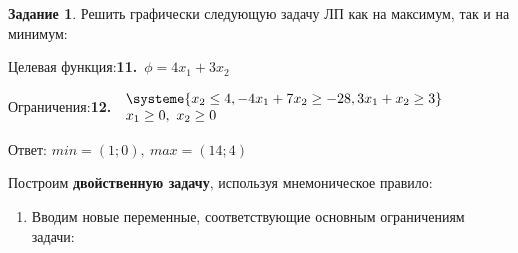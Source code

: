 \documentclass[11pt]{article}
\begin{document}
\textbf{Задание 1}. Решить графически следующую задачу ЛП как на максимум, так и на минимум:

Целевая функция:\quad  \textbf{11.}\  $\phi = 4x_1 + 3x_2$

Ограничения:\quad \textbf{12.}\  $
\begin{array}{l}
\systeme{  x_2 \leq 4, -4x_1 + 7x_2 \geq - 28, 3x_1 + x_2 \geq 3}\\
x_1 \geq 0,\ x_2 \geq 0
\end{array}
$

 \hfill

Ответ: $min = (1; 0),\  max = (14; 4)$

Построим  \textbf{двойственную задачу}, используя
мнемоническое правило:
\begin{enumerate}
	\item Вводим новые переменные, соответствующие основным ограничениям задачи:


\end{enumerate}
\end{document}
